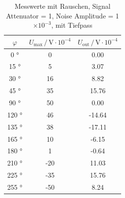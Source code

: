 \begin{table}[!h]
  \centering
  \begin{tabular}{S[table-format=4.0]SS}
    \toprule
    {$\varphi$} &
    {$U_\text{max} \,/\, \si{\volt}\cdot10^{-4}$} &
    {$U_\text{out} \,/\, \si{\volt}\cdot10^{-4}$} \\
       \si{\degree}  &    0     &      0.00 \\
   15   \si{\degree}  &    5     &      3.07 \\
   30   \si{\degree}  &    16    &      8.82 \\
   45   \si{\degree}  &    35    &     15.76 \\
   90   \si{\degree}  &    50    &      0.00 \\
  120   \si{\degree}  &    46    &    -14.64 \\
  135   \si{\degree}  &    38    &    -17.11 \\
  165   \si{\degree}  &    10    &     -6.15 \\
  180   \si{\degree}  &    1     &     -0.64 \\
  210   \si{\degree}  &    -20   &     11.03 \\
  225   \si{\degree}  &    -35   &     15.76 \\
  255   \si{\degree}  &    -50   &      8.24 \\
    \bottomrule
  \end{tabular}
  \label{tab:d}
\caption{Messwerte mit Rauschen, Signal Attenuator = 1,
        Noise Amplitude = 1$\times 10^{-3}$, mit Tiefpass}
\quad
\hfill
\end{table}


